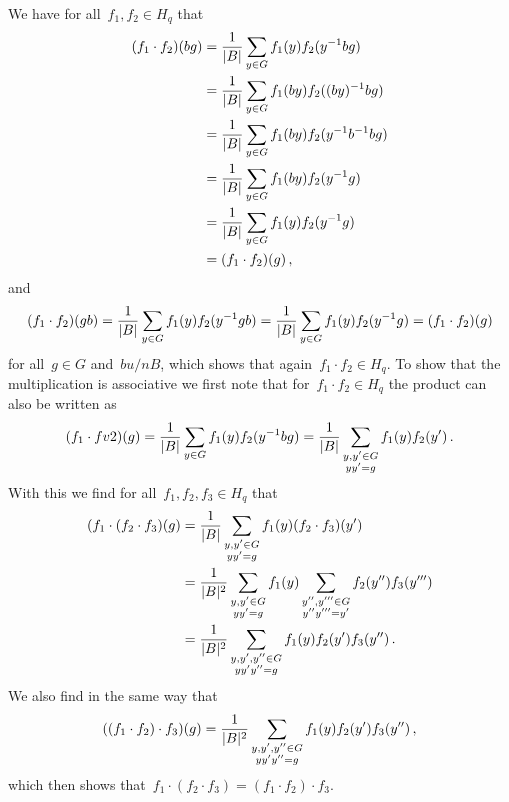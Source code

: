 We have for all~$f_1, f_2 \in H_q$ that
\begin{align*}
      (f_1 \cdot f_2)(bg)
  &=  \frac{1}{\lvert B\rvert} \sum_{y \in G} f_1(y) f_2(y^{-1} b g)  \\
  &=  \frac{1}{\lvert B\rvert} \sum_{y \in G} f_1(by) f_2((by)^{-1} bg) \\
  &=  \frac{1}{\lvert B\rvert} \sum_{y \in G} f_1(by) f_2(y^{-1} b^{-1} bg) \\
  &=  \frac{1}{\lvert B\rvert} \sum_{y \in G} f_1(by) f_2(y^{-1} g) \\
  &=  \frac{1}{\lvert B\rvert} \sum_{y \in G} f_1(y) f_2(y^{-1} g)  \\
  &=  (f_1 \cdot f_2)(g) \,,
\end{align*}
and
\[
    (f_1 \cdot f_2)(gb)
  = \frac{1}{\lvert B\rvert} \sum_{y \in G} f_1(y) f_2(y^{-1} g b)
  = \frac{1}{\lvert B\rvert} \sum_{y \in G} f_1(y) f_2(y^{-1} g)
  = (f_1 \cdot f_2)(g)
\]
for all~$g \in G$ and~$b u/n B$, which shows that again~$f_1 \cdot f_2 \in H_q$.
To show that the multiplication is associative we first note that for~$f_1 \cdot f_2 \in H_q$ the product can also be written as
\[
    (f_1 \cdot fv2)(g)
  = \frac{1}{\lvert B\rvert} \sum_{y \in G} f_1(y) f_2(y^{-1} b g)
  = \frac{1}{\lvert B\rvert} \sum_{\substack{y, y' \in G \\ y y' = g}} f_1(y) f_2(y') \,.
\]
With this we find for all~$f_1, f_2, f_3 \in H_q$ that
\begin{align*}
      (f_1 \cdot (f_2 \cdot f_3)(g)
  &=  \frac{1}{\lvert B\rvert}
      \sum_{\substack{y, y' \in G \\ y y' = g}}
      f_1(y) (f_2 \cdot f_3)(y')  \\
  &=  \frac{1}{\lvert B\rvert^2}
      \sum_{\substack{y, y' \in G \\ y y' = g}}
      f_1(y)
      \sum_{\substack{y'', y''' \in G \\ y'' y''' = y'}}
      f_2(y'') f_3(y''')  \\
  &=  \frac{1}{\lvert B\rvert^2}
      \sum_{\substack{y, y', y'' \in G \\ y y' y'' = g}}
      f_1(y) f_2(y') f_3(y'') \,.
\end{align*}
We also find in the same way that
\[
    ((f_1 \cdot f_2) \cdot f_3)(g)
  = \frac{1}{\lvert B\rvert^2}
    \sum_{\substack{y, y', y'' \in G \\ y y' y'' = g}}
    f_1(y) f_2(y') f_3(y'') \,,
\]
which then shows that~$f_1 \cdot (f_2 \cdot f_3) = (f_1 \cdot f_2) \cdot f_3$.

